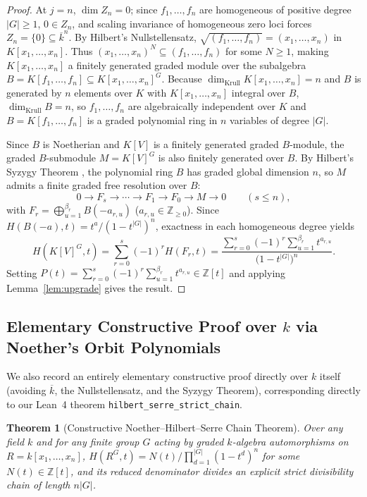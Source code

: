 \documentclass[11pt]{article}
\newtheorem{theorem}{Theorem}[section]
\theoremstyle{definition}
\theoremstyle{remark}
\begin{document}
\begin{proof}
At $j = n$, $\dim Z_n = 0$; since $f_1,\dots,f_n$ are homogeneous of positive degree $|G| \ge 1$, $0 \in Z_n$, and scaling invariance of homogeneous zero loci forces $Z_n = \{0\} \subseteq \overline{k}^n$. By Hilbert's Nullstellensatz, $\sqrt{(f_1,\dots,f_n)} = (x_1,\dots,x_n)$ in $K[x_1,\dots,x_n]$. Thus $(x_1,\dots,x_n)^N \subseteq (f_1,\dots,f_n)$ for some $N \ge 1$, making $K[x_1,\dots,x_n]$ a finitely generated graded module over the subalgebra $B = K[f_1,\dots,f_n] \subseteq K[x_1,\dots,x_n]^G$. Because $\dim_{\mathrm{Krull}} K[x_1,\dots,x_n] = n$ and $B$ is generated by $n$ elements over $K$ with $K[x_1,\dots,x_n]$ integral over $B$, $\dim_{\mathrm{Krull}} B = n$, so $f_1,\dots,f_n$ are algebraically independent over $K$ and $B = K[f_1,\dots,f_n]$ is a graded polynomial ring in $n$ variables of degree $|G|$.

Since $B$ is Noetherian and $K[V]$ is a finitely generated graded $B$-module, the graded $B$-submodule $M = K[V]^G$ is also finitely generated over $B$. By Hilbert's Syzygy Theorem \cite[Theorem~19.2]{Eisenbud}, the polynomial ring $B$ has graded global dimension $n$, so $M$ admits a finite graded free resolution over $B$:
\[
0 \longrightarrow F_s \longrightarrow \cdots \longrightarrow F_1 \longrightarrow F_0 \longrightarrow M \longrightarrow 0 \qquad (s \le n),
\]
with $F_r = \bigoplus_{u=1}^{\beta_r} B(-a_{r,u})$ ($a_{r,u} \in \mathbb{Z}_{\ge 0}$). Since $H(B(-a), t) = t^a / (1 - t^{|G|})^n$, exactness in each homogeneous degree yields
\[
H(K[V]^G, t) = \sum_{r=0}^{s} (-1)^r H(F_r, t) = \frac{\sum_{r=0}^{s} (-1)^r \sum_{u=1}^{\beta_r} t^{a_{r,u}}}{\bigl(1 - t^{|G|}\bigr)^n}.
\]
Setting $P(t) = \sum_{r=0}^{s} (-1)^r \sum_{u=1}^{\beta_r} t^{a_{r,u}} \in \mathbb{Z}[t]$ and applying Lemma~\ref{lem:upgrade} gives the result.
\end{proof}

\subsection{Elementary Constructive Proof over \texorpdfstring{$k$}{k} via Noether's Orbit Polynomials}

We also record an entirely elementary constructive proof directly over $k$ itself (avoiding $\overline{k}$, the Nullstellensatz, and the Syzygy Theorem), corresponding directly to our Lean~4 theorem \texttt{hilbert\_serre\_strict\_chain}.

\begin{theorem}[Constructive Noether--Hilbert--Serre Chain Theorem]
\label{thm:noether-hs}
Over any field $k$ and for any finite group $G$ acting by graded $k$-algebra automorphisms on $R = k[x_1,\dots,x_n]$, $H(R^G, t) = N(t) / \prod_{d=1}^{|G|} (1 - t^d)^n$ for some $N(t) \in \mathbb{Z}[t]$, and its reduced denominator divides an explicit strict divisibility chain of length $n|G|$.
\end{theorem}
\end{document}
